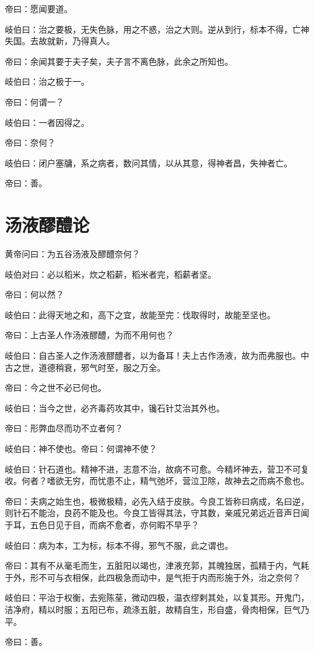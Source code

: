 \documentclass{article}%
\begin{document}
帝曰：愿闻要道。

岐伯曰：治之要极，无失色脉，用之不惑，治之大则。逆从到行，标本不得，亡神失国。去故就新，乃得真人。

帝曰：余闻其要于夫子矣，夫子言不离色脉，此余之所知也。

岐伯曰：治之极于一。

帝曰：何谓一？

岐伯曰：一者因得之。

帝曰：奈何？

岐伯曰：闭户塞牗，系之病者，数问其情，以从其意，得神者昌，失神者亡。

帝曰：善。
\section{汤液醪醴论}
黄帝问曰：为五谷汤液及醪醴奈何？

岐伯对曰：必以稻米，炊之稻薪，稻米者完，稻薪者坚。

帝曰：何以然？

岐伯曰：此得天地之和，高下之宜，故能至完：伐取得时，故能至坚也。

帝曰：上古圣人作汤液醪醴，为而不用何也？

岐伯曰：自古圣人之作汤液醪醴者，以为备耳！夫上古作汤液，故为而弗服也。中古之世，道德稍衰，邪气时至，服之万全。

帝曰：今之世不必已何也。

岐伯曰：当今之世，必齐毒药攻其中，镵石针艾治其外也。

帝曰：形弊血尽而功不立者何？

岐伯曰：神不使也。帝曰：何谓神不使？

岐伯曰：针石道也。精神不进，志意不治，故病不可愈。今精坏神去，营卫不可复收。何者？嗜欲无穷，而忧患不止，精气弛坏，营泣卫除，故神去之而病不愈也。

帝曰：夫病之始生也，极微极精，必先入结于皮肤。今良工皆称曰病成，名曰逆，则针石不能治，良药不能及也。今良工皆得其法，守其数，亲戚兄弟远近音声日闻于耳，五色日见于目，而病不愈者，亦何暇不早乎？

岐伯曰：病为本，工为标，标本不得，邪气不服，此之谓也。

帝曰：其有不从毫毛而生，五脏阳以竭也，津液充郭，其魄独居，孤精于内，气耗于外，形不可与衣相保，此四极急而动中，是气拒于内而形施于外，治之奈何？

岐伯曰：平治于权衡，去宛陈莝，微动四极，温衣缪剌其处，以复其形。开鬼门，洁净府，精以时服；五阳已布，疏涤五脏，故精自生，形自盛，骨肉相保，巨气乃平。

帝曰：善。
\end{document}
